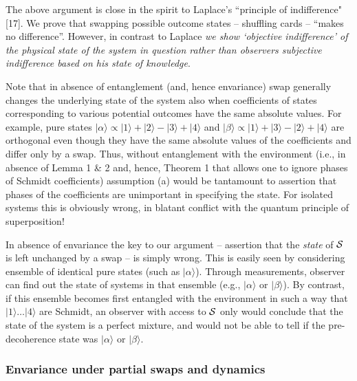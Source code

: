 \documentclass[aps,twocolumn,pra,epsfig]{revtex4}
\begin{document}
The above argument is close in the spirit to Laplace's ``principle of
indifference" [17]. We prove that swapping possible outcome states -- shuffling
cards -- ``makes no difference''. However, in contrast to Laplace {\it we show
`objective indifference' of the physical state of the system in question rather 
than observers subjective indifference based on his state of knowledge}.

Note that in absence of entanglement (and, hence envariance) swap generally 
changes the underlying state of the system also when coefficients of states
corresponding to various potential outcomes have the same absolute values. 
For example, pure states 
$|\alpha\rangle \propto |1\rangle +|2\rangle-|3\rangle+|4\rangle$ and
$|\beta\rangle \propto |1\rangle +|3\rangle-|2\rangle+|4\rangle$ are orthogonal
even though they have the same absolute values of the coefficients and differ
only by a swap. Thus, without entanglement with the environment (i.e.,
in absence of Lemma 1 \& 2 and, hence, Theorem 1 that allows one to
ignore phases of Schmidt coefficients) assumption (a) would be tantamount
to assertion that phases of the coefficients are unimportant in specifying
the state. For isolated systems this is obviously wrong, in blatant 
conflict with the quantum principle of superposition! 

In absence of envariance the key to our argument -- assertion that the 
{\it state} of ${\cal S}$ is left unchanged by a swap -- is simply wrong. 
This is easily seen by considering ensemble of identical pure states (such
as $|\alpha\rangle$). Through measurements, observer can
find out the state of systems in that ensemble (e.g., 
 $|\alpha\rangle$ or $|\beta\rangle$). By contrast,
if this ensemble becomes first entangled with the environment in
such a way that $|1\rangle \dots |4\rangle$ are Schmidt, an observer with
access to ${\cal S}$ only would conclude that the state of the system is
a perfect mixture, and would not be able to tell if the pre-decoherence state
was $|\alpha\rangle$ or $|\beta\rangle$.

\subsubsection{Envariance under partial swaps and dynamics}
\end{document}
